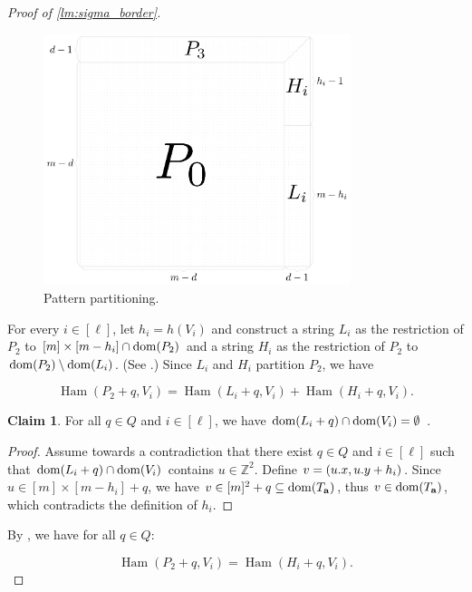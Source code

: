 \documentclass[11pt, letterpaper]{article}
\theoremstyle{plain}
\theoremstyle{definition}
\newtheorem{claim}{Claim}
\theoremstyle{remark}
\newcommand{\Z}{\mathbb{Z}}
\DeclareMathOperator*{\Ham}{Ham}
\begin{document}
\begin{proof}[{Proof of \cref{lm:sigma_border}}]
\begin{figure}[!t]
	\begin{center}
		\includegraphics[width=0.8\textwidth]{drawings/pattern_restriction}
	\end{center}
	\caption{Pattern partitioning.}
	\label{figure:pattern_restriction}
\end{figure}

For every $i \in [\ell]$, let $h_i = h(V_i)$ and construct a string $L_i$ as the restriction of $P_2$ to $[m] \times [m - h_i] \cap \operatorname*{dom}(P_2)$ and a string $H_i$ as the restriction of $P_2$ to $\operatorname*{dom}(P_2) \setminus \operatorname*{dom}(L_i)$. (See .) Since $L_i$ and $H_i$ partition $P_2$, we have

\[\Ham(P_2 + q, V_i) = \Ham(L_i + q, V_i) + \Ham(H_i + q, V_i). \]

\begin{claim}\label{pattern_height_reduction}
For all $q \in Q$ and $i \in [\ell]$, we have $\operatorname*{dom}(L_i + q) \cap \operatorname*{dom}(V_i) = \emptyset$ .
\end{claim}
\begin{proof}
Assume towards a contradiction that there exist $q \in Q$ and $i \in [\ell]$ such that $\operatorname*{dom}(L_i + q) \cap \operatorname*{dom}(V_i)$ contains $u \in \Z^2$. Define $v = (u.x, u.y + h_i)$.
Since $u \in [m] \times [m - h_i] + q$, we have $v \in [m]^2 + q \subseteq \operatorname*{dom}(T_\mathbf{a})$, thus $v \in \operatorname*{dom}(T_\mathbf{a})$, which contradicts the definition of $h_i$.
\end{proof}

By , we have for all $q \in Q$:

\[\Ham(P_2 + q, V_i) = \Ham(H_i + q, V_i). \]


\end{proof}
\end{document}
